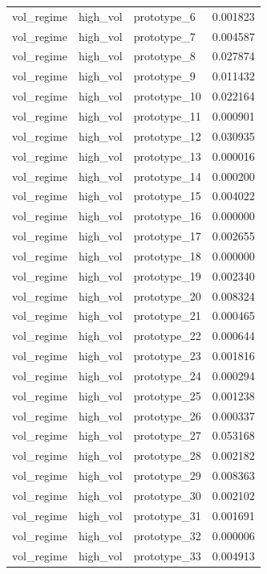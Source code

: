\begin{tabular}{lllr}
vol\_regime & high\_vol & prototype\_6 & 0.001823 \\
vol\_regime & high\_vol & prototype\_7 & 0.004587 \\
vol\_regime & high\_vol & prototype\_8 & 0.027874 \\
vol\_regime & high\_vol & prototype\_9 & 0.011432 \\
vol\_regime & high\_vol & prototype\_10 & 0.022164 \\
vol\_regime & high\_vol & prototype\_11 & 0.000901 \\
vol\_regime & high\_vol & prototype\_12 & 0.030935 \\
vol\_regime & high\_vol & prototype\_13 & 0.000016 \\
vol\_regime & high\_vol & prototype\_14 & 0.000200 \\
vol\_regime & high\_vol & prototype\_15 & 0.004022 \\
vol\_regime & high\_vol & prototype\_16 & 0.000000 \\
vol\_regime & high\_vol & prototype\_17 & 0.002655 \\
vol\_regime & high\_vol & prototype\_18 & 0.000000 \\
vol\_regime & high\_vol & prototype\_19 & 0.002340 \\
vol\_regime & high\_vol & prototype\_20 & 0.008324 \\
vol\_regime & high\_vol & prototype\_21 & 0.000465 \\
vol\_regime & high\_vol & prototype\_22 & 0.000644 \\
vol\_regime & high\_vol & prototype\_23 & 0.001816 \\
vol\_regime & high\_vol & prototype\_24 & 0.000294 \\
vol\_regime & high\_vol & prototype\_25 & 0.001238 \\
vol\_regime & high\_vol & prototype\_26 & 0.000337 \\
vol\_regime & high\_vol & prototype\_27 & 0.053168 \\
vol\_regime & high\_vol & prototype\_28 & 0.002182 \\
vol\_regime & high\_vol & prototype\_29 & 0.008363 \\
vol\_regime & high\_vol & prototype\_30 & 0.002102 \\
vol\_regime & high\_vol & prototype\_31 & 0.001691 \\
vol\_regime & high\_vol & prototype\_32 & 0.000006 \\
vol\_regime & high\_vol & prototype\_33 & 0.004913 \\

\end{tabular}

